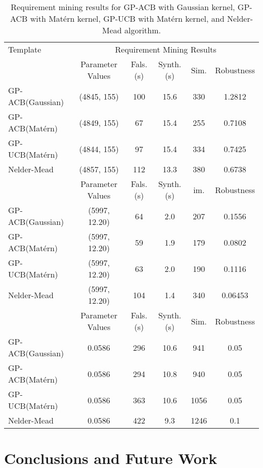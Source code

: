 \documentclass[10pt]{article}
\theoremstyle{plain}
\begin{document}
\begin{table}[!htb]
\centering  
\label{requirement mining}
\caption{Requirement mining results for GP-ACB with Gaussian kernel, GP-ACB with Mat\'{e}rn kernel, GP-UCB with Mat\'{e}rn kernel, and Nelder-Mead algorithm.}
\begin{tabular}{l|ccccc}   
\hline
Template &\multicolumn{5}{c}{Requirement Mining Results}\\     
 &Parameter Values  &Fals.(s)  &Synth.(s)  &Sim. &Robustness\\ \hline  GP-ACB(Gaussian)         &(4845, 155) &100 &15.6 &330   &1.2812\\   
GP-ACB(Mat\'{e}rn) &(4849, 155) &67	&15.4	&255	&0.7108\\          
GP-UCB(Mat\'{e}rn) &(4844, 155)	&97	&15.4	&334	&0.7425\\      
Nelder-Mead        &(4857, 155)&112&13.3	&380	&0.6738\\ \hline
 &Parameter Values  &Fals.(s)  &Synth.(s)  &im. &Robustness\\ \hline  GP-ACB(Gaussian)         &(5997, 12.20) &64 &2.0 &207 &0.1556\\   
GP-ACB(Mat\'{e}rn) &(5997, 12.20) &59 &1.9 &179 &0.0802\\          
GP-UCB(Mat\'{e}rn) &(5997, 12.20) &63 &2.0 &190 &0.1116\\      
Nelder-Mead        &(5997, 12.20) &104 &1.4 &340 &0.06453\\ \hline
 &Parameter Values  &Fals.(s)  &Synth.(s)  &Sim. &Robustness\\ \hline  GP-ACB(Gaussian)         &0.0586 &296 &10.6 &941 &0.05\\   
GP-ACB(Mat\'{e}rn) &0.0586 &294 &10.8 &940 &0.05\\          
GP-UCB(Mat\'{e}rn) &0.0586 &363 &10.6 &1056 &0.05\\      
Nelder-Mead        &0.0586 &422 &9.3  &1246 &0.1\\ \hline
\end{tabular}
\end{table}



\section{Conclusions and Future Work}
\label{conclusion}
\end{document}
